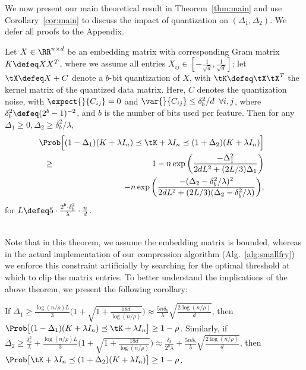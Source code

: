 We now present our main theoretical result in Theorem~\ref{thm:main} and use Corollary~\ref{cor:main} to discuss the impact of quantization on  $(\Delta_1, \Delta_2)$. We defer all proofs to the Appendix.
\begin{theorem}
	\label{thm:main}
	Let $X \in \RR^{n\times d}$ be an embedding matrix with corresponding Gram matrix $K \defeq XX^T$, where we assume all entries $X_{ij} \in [-\frac{1}{\sqrt{d}},\frac{1}{\sqrt{d}}]$; let $\tX\defeq X+C$ denote a $b$-bit quantization of $X$, with $\tK \defeq \tX\tX^T$ the kernel matrix of the quantized data matrix. Here, $C$ denotes the quantization noise, with $\expect{}{C_{ij}} = 0$ and $\var{}{C_{ij}} \leq \delta_b^2/d \;\;\forall i,j$, where $\delta_b^2 \defeq (2^b-1)^{-2}$, and $b$ is the number of bits used per feature.
	Then for any $\Delta_1 \geq 0, \Delta_2 \geq \delta^2_b/\lambda$,
	\begin{eqnarray*}
	&&\hspace{-0.37in}\Prob\Big[(1- \Delta_1) (K + \lambda I_n) \preceq \tK + \lambda I_n \preceq (1 + \Delta_2) (K + \lambda I_n)
	\Big] 
	\\ &\geq& 1 - 
	n \exp \bigg(\frac{-\Delta_1^2}{2dL^2 + (2L/3)\Delta_1}\bigg) \\
	&&- n \exp \bigg(\frac{-(\Delta_2-\delta_b^2/\lambda)^2}{2dL^2 + (2L/3)(\Delta_2-\delta_b^2/\lambda)}\bigg),
	\end{eqnarray*}
	for $L \defeq 5 \cdot \frac{2^b \cdot \delta_b^2}{\lambda}\cdot \frac{n}{d}$.
\end{theorem}
\\
Note that in this theorem, we assume the embedding matrix is bounded, whereas in the actual implementation of our compression algorithm (Alg.~\ref{alg:smallfry}) we enforce this constraint artificially by searching for the optimal threshold at which to clip the matrix entries.
To better understand the implications of the above theorem, we present the following corollary:
\begin{corollary}
	\label{cor:main}
	If $\Delta_1 \geq \frac{\log(n/\rho)L}{3}\Big(1+\sqrt{1+\frac{18d}{\log(n/\rho)}}\Big) \approx \frac{5n \delta_b}{ \lambda}\sqrt{\frac{2\log(n/\rho)}{d}}$,
	then $\Prob\big[(1 - \Delta_1) (K + \lambda I_n) \preceq \tK + \lambda I_n \big] \geq  1 - \rho$. 
	Similarly, if $\Delta_2 \geq \frac{\delta_b^2}{\lambda} +  \frac{\log(n/\rho)L}{3}\Big(1+\sqrt{1+\frac{18d}{\log(n/\rho)}}\Big) \approx \frac{\delta_b}{2^{b}\lambda} + \frac{5n\delta_b}{\lambda}\sqrt{\frac{2\log(n/\rho)}{d}}$,
	then $\Prob\big[\tK + \lambda I_n \preceq (1 + \Delta_2) (K + \lambda I_n)\big] \geq  1 - \rho$. 
\end{corollary}

